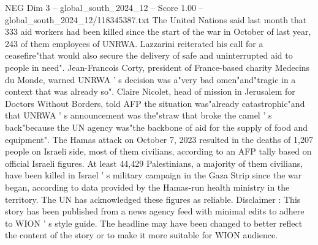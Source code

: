 \begin{textsample}{NEG Dim 3 – global\_south\_2024\_12 – Score 1.00 – global\_south\_2024\_12/118345387.txt}
The United Nations said last month that 333 aid workers had been killed since the start of the war in October of last year, 243 of them employees of UNRWA.
Lazzarini reiterated his call for a ceasefire"that would also secure the delivery of safe and uninterrupted aid to people in need".
Jean-Francois Corty, president of France-based charity Medecins du Monde, warned UNRWA ' s decision was a"very bad omen"and"tragic in a context that was already so".
Claire Nicolet, head of mission in Jerusalem for Doctors Without Borders, told AFP the situation was"already catastrophic"and that UNRWA ' s announcement was the"straw that broke the camel ' s back"because the UN agency was"the backbone of aid for the supply of food and equipment".
The Hamas attack on October 7, 2023 resulted in the deaths of 1,207 people on Israeli side, most of them civilians, according to an AFP tally based on official Israeli figures.
At least 44,429 Palestinians, a majority of them civilians, have been killed in Israel ' s military campaign in the Gaza Strip since the war began, according to data provided by the Hamas-run health ministry in the territory.
The UN has acknowledged these figures as reliable.
Disclaimer : This story has been published from a news agency feed with minimal edits to adhere to WION ' s style guide.
The headline may have been changed to better reflect the content of the story or to make it more suitable for WION audience.

\end{textsample}
